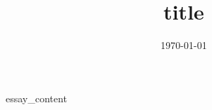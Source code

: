 \documentclass[UTF8]{ctexart}
\title{{{ title }}}
\author{}
\date{\today}
\begin{document}
\maketitle

{{ essay_content }}
\end{document}
